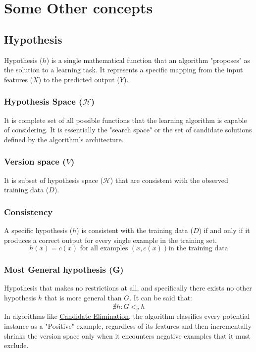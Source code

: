 \documentclass[12pt]{article}
\begin{document}
\section{Some Other concepts}
\subsection{Hypothesis}
Hypothesis ($h$) is a single mathematical function that an algorithm "proposes" as the solution to a learning task. It represents a specific mapping from the input features ($X$) to the predicted output ($Y$).
\subsubsection{\texorpdfstring{Hypothesis Space ($\mathcal{H}$)}{Hypothesis Space (H)}}
It is complete set of all possible functions that the learning algorithm is capable of considering. It is essentially the "search space" or the set of candidate solutions defined by the algorithm's architecture.

\subsubsection{\texorpdfstring{Version space ($V$)}{Version space (V)}}
It is subset of hypothesis space ($\mathcal{H}$) that are consistent with the observed training data ($D$).

\subsubsection{Consistency}
A specific hypothesis ($h$) is consistent with the training data ($D$) if and only if it produces a correct output for every single example in the training set.
$$h(x) = c(x) \text{ for all examples }(x, c(x)) \text{in the training data}$$

\subsubsection{Most General hypothesis (G)}
Hypothesis that makes no restrictions at all, and specifically there exists no other hypothesis $h$ that is more general than $G$. It can be said that:
$$\nexists h : G <_g h$$
In algorithms like \href{https://www.geeksforgeeks.org/machine-learning/ml-candidate-elimination-algorithm/}{Candidate Elimination}, the algorithm classifies every potential instance as a "Positive" example, regardless of its features and then incrementally shrinks the version space only when it encounters negative examples that it must exclude.
\end{document}
